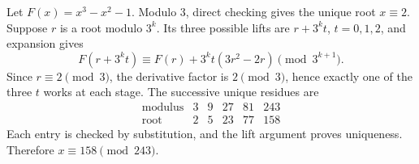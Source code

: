 Let $F(x)=x^3-x^2-1$. Modulo $3$, direct checking gives the unique root $x\equiv2$. Suppose $r$ is a root modulo $3^k$. Its three possible lifts are $r+3^kt$, $t=0,1,2$, and expansion gives
\[
F(r+3^kt)\equiv F(r)+3^kt(3r^2-2r)\pmod{3^{k+1}}.
\]
Since $r\equiv2\pmod3$, the derivative factor is $2\pmod3$, hence exactly one of the three $t$ works at each stage. The successive unique residues are
\[
\begin{array}{c|ccccc}
\text{modulus}&3&9&27&81&243\\ \hline
\text{root}&2&5&23&77&158
\end{array}
\]
Each entry is checked by substitution, and the lift argument proves uniqueness. Therefore $\boxed{x\equiv158\pmod{243}}$.
